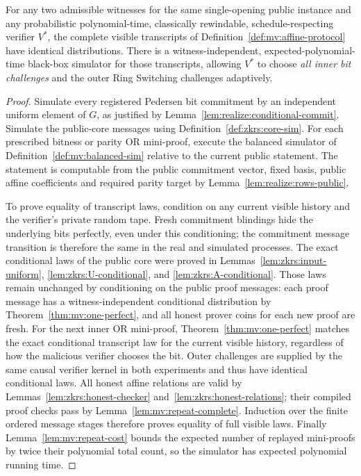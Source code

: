 \begin{theorem}\label{thm:mv:affine-mvzk}
For any two admissible witnesses for the
same single-opening public instance and
any probabilistic polynomial-time,
classically rewindable, schedule-respecting
verifier $V^*$, the complete visible
transcripts of
Definition~\ref{def:mv:affine-protocol}
have identical distributions.
There is a witness-independent,
expected-polynomial-time black-box simulator
for those transcripts, allowing $V^*$
to choose \emph{all inner bit challenges}
and the outer Ring Switching challenges
adaptively.
\end{theorem}
\begin{proof}
Simulate every registered Pedersen bit
commitment by an independent uniform
element of $G$, as justified by
Lemma~\ref{lem:realize:conditional-commit}.
Simulate the public-core messages
using Definition~\ref{def:zkrs:core-sim}.
For each prescribed bitness or parity
OR mini-proof, execute the balanced
simulator of
Definition~\ref{def:mv:balanced-sim}
relative to the current public statement.
The statement is computable from the
public commitment vector, fixed basis,
public affine coefficients and required
parity target by
Lemma~\ref{lem:realize:rows-public}.

To prove equality of transcript laws,
condition on any current visible history
and the verifier's private random tape.
Fresh commitment blindings hide the
underlying bits perfectly, even under
this conditioning; the commitment
message transition is therefore
the same in the real and simulated
processes.
The exact conditional laws of the
public core were proved in
Lemmas~\ref{lem:zkrs:input-uniform},
\ref{lem:zkrs:U-conditional}, and
\ref{lem:zkrs:A-conditional}.
Those laws remain unchanged by
conditioning on the public proof
messages: each proof message has
a witness-independent conditional
distribution by
Theorem~\ref{thm:mv:one-perfect},
and all honest prover coins for
each new proof are fresh.
For the next inner OR mini-proof,
Theorem~\ref{thm:mv:one-perfect}
matches the exact conditional
transcript law for the current
visible history, regardless of
how the malicious verifier chooses
the bit.
Outer challenges are supplied by
the same causal verifier kernel
in both experiments and thus
have identical conditional laws.
All honest affine relations are
valid by Lemmas~\ref{lem:zkrs:honest-checker}
and~\ref{lem:zkrs:honest-relations};
their compiled proof checks pass
by Lemma~\ref{lem:mv:repeat-complete}.
Induction over the finite ordered
message stages therefore proves
equality of full visible laws.
Finally Lemma~\ref{lem:mv:repeat-cost}
bounds the expected number of
replayed mini-proofs by twice
their polynomial total count,
so the simulator has expected
polynomial running time.
\end{proof}

